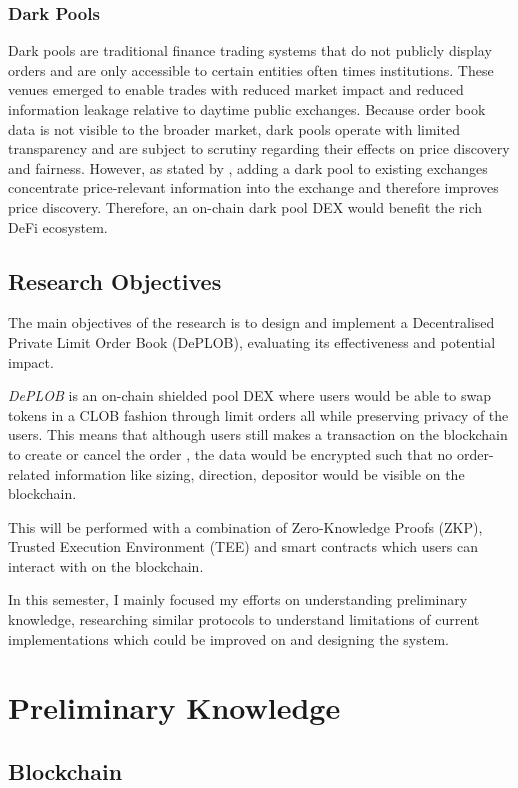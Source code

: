\documentclass[12pt,a4paper]{article}
\begin{document}
\subsubsection{Dark Pools}
Dark pools are traditional finance trading systems that do not publicly display orders and are only accessible to certain entities often times institutions. These venues emerged to enable trades with reduced market impact and reduced information leakage relative to daytime public exchanges. Because order book data is not visible to the broader market, dark pools operate with limited transparency and are subject to scrutiny regarding their effects on price discovery and fairness. However, as stated by \textcite{zhu2014dark}, adding a dark pool to existing exchanges concentrate price-relevant information into the exchange and therefore improves price discovery. Therefore, an on-chain dark pool DEX would benefit the rich DeFi ecosystem. 

\subsection{Research Objectives}
The main objectives of the research is to design and implement a Decentralised Private Limit Order Book (DePLOB), evaluating its effectiveness and potential impact.

\textit{DePLOB} is an on-chain shielded pool DEX where users would be able to swap tokens in a CLOB fashion through limit orders all while preserving privacy of the users. This means that although users still makes a transaction on the blockchain to create or cancel the order , the data would be encrypted such that no order-related information like sizing, direction, depositor would be visible on the blockchain. 

This will be performed with a combination of Zero-Knowledge Proofs (ZKP), Trusted Execution Environment (TEE) and smart contracts which users can interact with on the blockchain.

In this semester, I mainly focused my efforts on understanding preliminary knowledge, researching similar protocols to understand limitations of current implementations which could be improved on and designing the system.

\section{Preliminary Knowledge}
\subsection{Blockchain}
\end{document}
